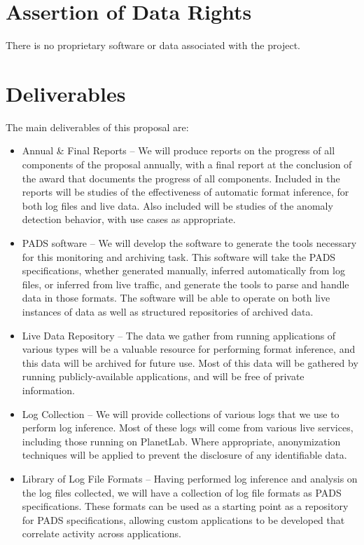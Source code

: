\documentclass[12pt]{article}
\begin{document}
\section{Assertion of Data Rights}

There is no proprietary software or data associated with the project.

\section{Deliverables}

The main deliverables of this proposal are:

\begin{itemize}
\item Annual \& Final Reports -- We will produce reports on the
progress of all components of the proposal annually, with a final
report at the conclusion of the award that documents the progress of
all components. Included in the reports will be studies of the
effectiveness of automatic format inference, for both log files and
live data. Also included will be studies of the anomaly detection
behavior, with use cases as appropriate.

\item PADS software -- We will develop the software to generate the
tools necessary for this monitoring and archiving task. This software
will take the PADS specifications, whether generated manually,
inferred automatically from log files, or inferred from live traffic,
and generate the tools to parse and handle data in those formats. The
software will be able to operate on both live instances of data as
well as structured repositories of archived data.

\item Live Data Repository -- The data we gather from running
applications of various types will be a valuable resource for
performing format inference, and this data will be archived for future
use. Most of this data will be gathered by running
publicly-available applications, and will be free of private
information.

\item Log Collection -- We will provide collections of various logs
that we use to perform log inference. Most of these logs will come
from various live services, including those running on PlanetLab.
Where appropriate, anonymization techniques will be applied to
prevent the disclosure of any identifiable data.

\item Library of Log File Formats -- Having performed log inference
and analysis on the log files collected, we will have a collection of
log file formats as PADS specifications. These formats can be used as
a starting point as a repository for PADS specifications, allowing
custom applications to be developed that correlate activity across
applications.


\end{itemize}
\end{document}
